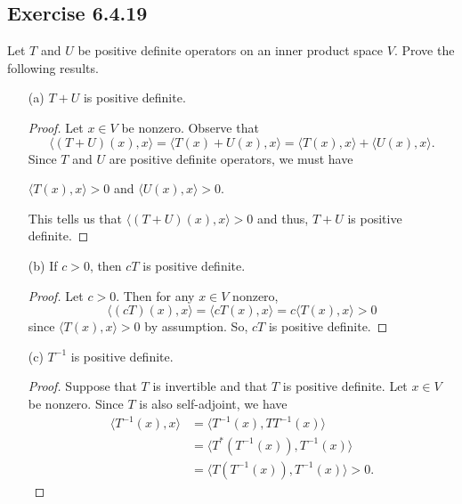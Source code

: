 \subsection*{Exercise 6.4.19} Let \( T  \) and \( U  \) be positive definite operators on an inner product space \( V  \). Prove the following results.
\begin{enumerate}
    \item[(a)] \( T + U  \) is positive definite.
        \begin{proof}
         Let \( x \in V  \) be nonzero. Observe that  
        \[  \langle (T+U)(x) , x \rangle = \langle T(x) + U(x) , x  \rangle = \langle T(x) , x  \rangle + \langle U(x) , x \rangle.  \]
        Since \( T  \) and \( U  \) are positive definite operators, we must have 
        \begin{center}
            \( \langle T(x) , x \rangle > 0  \) and \( \langle U(x) , x \rangle > 0  \).
        \end{center}
        This tells us that \( \langle (T+U)(x) , x \rangle > 0   \) and thus, \( T + U  \) is positive definite.
\end{proof}
    \item[(b)] If \( c > 0  \), then \( cT  \) is positive definite.
        \begin{proof}
        Let \( c > 0  \). Then for any \( x \in V  \) nonzero, 
        \[  \langle (cT)(x) , x  \rangle = \langle c T(x) , x \rangle = c \langle T(x) , x \rangle > 0  \]
        since \( \langle T(x) , x \rangle > 0  \) by assumption. So, \( cT \) is positive definite.
        \end{proof}
    \item[(c)] \( T^{-1}  \) is positive definite.
        \begin{proof}
        Suppose that \( T  \) is invertible and that \( T  \) is positive definite. Let \( x \in V  \) be nonzero. Since \( T  \) is also self-adjoint, we have
        \begin{align*}
            \langle T^{-1}(x) , x \rangle &= \langle T^{-1}(x) , T T^{-1}(x) \rangle \\
                                          &= \langle T^{*}(T^{-1}(x)) , T^{-1}(x) \rangle \\
                                          &= \langle T (T^{-1}(x)) , T^{-1}(x)  \rangle > 0. 
        \end{align*}
        \end{proof}
\end{enumerate}

